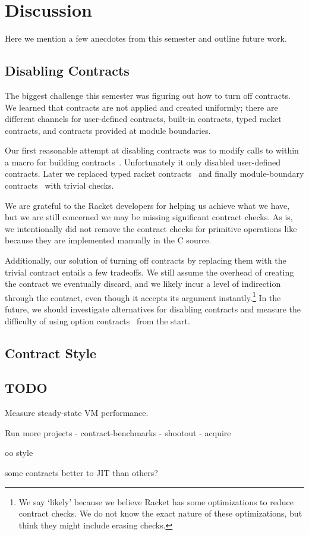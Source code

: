 \section{Discussion}
\label{discussion}

Here we mention a few anecdotes from this semester and outline future work.

\subsection{Disabling Contracts}
\label{disabling-contracts}

The biggest challenge this semester was figuring out how to turn off contracts.
We learned that contracts are not applied and created uniformly; there are different channels for user-defined contracts, built-in contracts, typed racket contracts, and contracts provided at module boundaries.

Our first reasonable attempt at disabling contracts was to modify calls to  within a macro for building contracts~\cite{no-contracts1}.
Unfortunately it only disabled user-defined contracts.
Later we replaced typed racket contracts~\cite{no-contracts2} and finally module-boundary contracts~\cite{no-contracts3} with trivial checks.

We are grateful to the Racket developers for helping us achieve what we have, but we are still concerned we may be missing significant contract checks.
As is, we intentionally did not remove the contract checks for primitive operations like \mono{+} because they are implemented manually in the C source.

Additionally, our solution of turning off contracts by replacing them with the trivial  contract entails a few tradeoffs.
We still assume the overhead of creating the contract we eventually discard, and we likely incur a level of indirection through the  contract, even though it accepts its argument instantly.\footnote{We say `likely' because we believe Racket has some optimizations to reduce contract checks. We do not know the exact nature of these optimizations, but think they might include erasing  checks.}
In the future, we should investigate alternatives for disabling contracts and measure the difficulty of using option contracts~\cite{option-contracts} from the start.

\subsection{Contract Style}


\subsection{TODO}

Measure steady-state VM performance.

Run more projects
- contract-benchmarks
- shootout
- acquire

oo style

some contracts better to JIT than others?